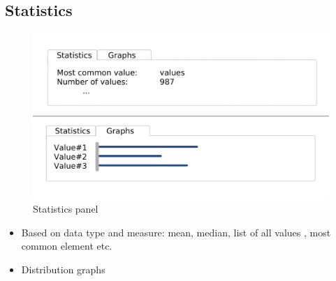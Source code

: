 \documentclass[]{article}
\begin{document}
\subsection{Statistics}
\begin{figure}[H]
	\includegraphics[width=\linewidth]{stat.png}
	\caption{Statistics panel}
	\label{fig:s1}
\end{figure}
\begin{itemize}
	\item Based on data type and measure: mean, median, list of all values , most common element etc.
	\item Distribution graphs
\end{itemize}

\newpage
\end{document}
